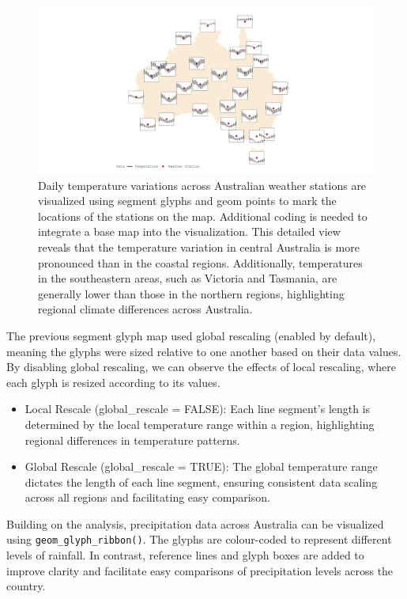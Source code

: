\begin{figure}

{\centering \includegraphics[width=1\linewidth]{figures/temp_var} 

}

\caption{Daily temperature variations across Australian weather stations are visualized using segment glyphs and geom points to mark the locations of the stations on the map. Additional coding is needed to integrate a base map into the visualization. This detailed view reveals that the temperature variation in central Australia is more pronounced than in the coastal regions. Additionally, temperatures in the southeastern areas, such as Victoria and Tasmania, are generally lower than those in the northern regions, highlighting regional climate differences across Australia.}\label{fig:unnamed-chunk-9}
\end{figure}

The previous segment glyph map used global rescaling (enabled by default), meaning the glyphs were sized relative to one another based on their data values. By disabling global rescaling, we can observe the effects of local rescaling, where each glyph is resized according to its values.

\begin{itemize}
\tightlist
\item
  Local Rescale (global\_rescale = FALSE): Each line segment's length is determined by the local temperature range within a region, highlighting regional differences in temperature patterns.
\item
  Global Rescale (global\_rescale = TRUE): The global temperature range dictates the length of each line segment, ensuring consistent data scaling across all regions and facilitating easy comparison.
\end{itemize}

Building on the analysis, precipitation data across Australia can be visualized using \texttt{geom\_glyph\_ribbon()}. The glyphs are colour-coded to represent different levels of rainfall. In contrast, reference lines and glyph boxes are added to improve clarity and facilitate easy comparisons of precipitation levels across the country.

